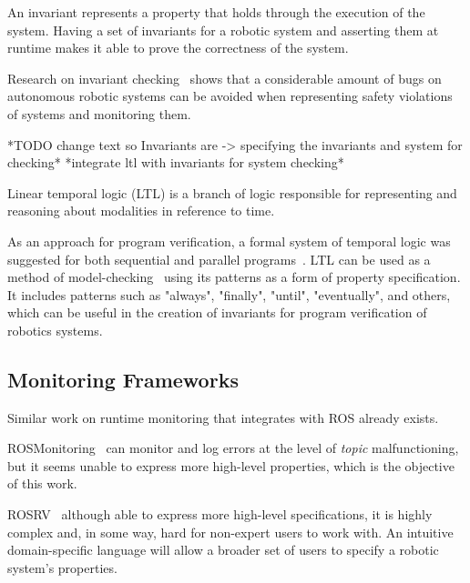 An invariant represents a property that holds through the execution of the system. Having a set of invariants for a robotic system and asserting them at runtime makes it able to prove the correctness of the system.

Research on invariant checking~\cite{zizyte2021importance} shows that a considerable amount of bugs on autonomous robotic systems can be avoided when representing safety violations of systems and monitoring them.

*TODO change text so Invariants are -> specifying the invariants and system for checking*
*integrate ltl with invariants for system checking*

Linear temporal logic (LTL) is a branch of logic responsible for representing and reasoning about modalities in reference to time. 

As an approach for program verification, a formal system of temporal logic was suggested for both sequential and parallel programs~\cite{pnueli1977temporal}. LTL can be used as a method of model-checking~\cite{dwyer1998property} using its patterns as a form of property specification. It includes patterns such as "always", "finally", "until", "eventually", and others, which can be useful in the creation of invariants for program verification of robotics systems.


\subsection{Monitoring Frameworks}
\label{ssec:monitoringframeworks}

Similar work on runtime monitoring that integrates with ROS already exists. 

ROSMonitoring~\cite{ferrando2020rosmonitoring} can monitor and log errors at the level of \textit{topic} malfunctioning, but it seems unable to express more high-level properties, which is the objective of this work. 

ROSRV~\cite{huang2014rosrv} although able to express more high-level specifications, it is highly complex and, in some way, hard for non-expert users to work with. An intuitive domain-specific language will allow a broader set of users to specify a robotic system's properties. 

